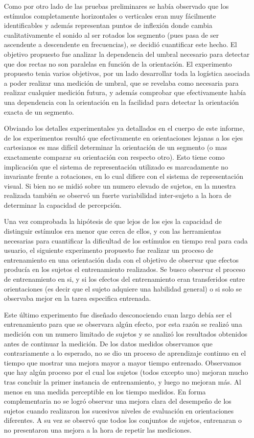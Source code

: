 \documentclass{article}
\numberwithin{figure}{section}
\begin{document}
    Como por otro lado de las pruebas preliminares se había observado que los estímulos completamente horizontales o verticales eran muy fácilmente identificables y además representan puntos de inflexión donde cambia cualitativamente el sonido al ser rotados los segmento (pues pasa de ser ascendente a descendente en frecuencias), se decidió cuantificar este hecho. El objetivo propuesto fue analizar la dependencia del umbral necesario para detectar que dos rectas no son paralelas en función de la orientación. El experimento propuesto tenia varios objetivos, por un lado desarrollar toda la logística asociada a poder realizar una medición de umbral, que se revelaba como necesaria para realizar cualquier medición futura, y además comprobar que efectivamente había una dependencia con la orientación en la facilidad para detectar la orientación exacta de un segmento. 
    
    Obviando los detalles experimentales ya detallados en el cuerpo de este informe, de los experimentos resultó que efectivamente en orientaciones lejanas a los ejes cartesianos es mas difícil determinar la orientación de un segmento (o mas exactamente comparar su orientación con respecto otro). Esto tiene como implicación que el sistema de representación utilizado es marcadamente no invariante frente a rotaciones, en lo cual difiere con el sistema de representación visual. Si bien no se midió sobre un numero elevado de sujetos, en la muestra realizada también se observó un fuerte variabilidad inter-sujeto a la hora de determinar la capacidad de percepción. 
    
    Una vez comprobada la hipótesis de que lejos de los ejes la capacidad de distinguir estímulos era menor que cerca de ellos, y con las herramientas necesarias para cuantificar la dificultad de los estímulos en tiempo real para cada usuario, el siguiente experimento propuesto fue realizar un proceso de entrenamiento en una orientación dada con el objetivo de observar que efectos producía en los sujetos el entrenamiento realizados. Se busco observar el proceso de entrenamiento en si, y si los efectos del entrenamiento eran transferidos entre orientaciones (es decir que el sujeto adquiere una habilidad general) o si solo se observaba mejor en la tarea especifica entrenada.
    
    Este último experimento fue diseñado desconociendo cuan largo debía ser el entrenamiento para que se observara algún efecto, por esta razón se realizó una medición con un numero limitado de sujetos y se analizó los resultados obtenidos antes de continuar la medición. De los datos medidos observamos que contrariamente a lo esperado, no se dio un proceso de aprendizaje continuo en el tiempo que mostrar una mejora mayor a mayor tiempo entrenado. Observamos que hay algún proceso por el cual los sujetos (todos excepto uno) mejoran mucho tras concluir la primer instancia de entrenamiento, y luego no mejoran más. Al menos en una medida perceptible en los tiempo medidos. En forma complementaria no se logró observar una mejora clara del desempeño de los sujetos cuando realizaron los sucesivos niveles de evaluación en orientaciones diferentes. A su vez se observó que todos los conjuntos de sujetos, entrenaran o no presentaron una mejora a la hora de repetir las mediciones. 
    
\end{document}
